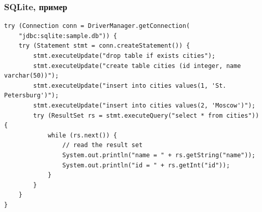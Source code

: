 \documentclass[xetex,mathserif,serif]{beamer}
\begin{document}
	\begin{frame}[fragile]
		\frametitle{SQLite, пример}
		\begin{footnotesize}
			\begin{verbatim}
try (Connection conn = DriverManager.getConnection(
    "jdbc:sqlite:sample.db")) {
    try (Statement stmt = conn.createStatement()) {
        stmt.executeUpdate("drop table if exists cities");
        stmt.executeUpdate("create table cities (id integer, name varchar(50))");
        stmt.executeUpdate("insert into cities values(1, 'St. Petersburg')");
        stmt.executeUpdate("insert into cities values(2, 'Moscow')");
        try (ResultSet rs = stmt.executeQuery("select * from cities")) {
            while (rs.next()) {
                // read the result set
                System.out.println("name = " + rs.getString("name"));
                System.out.println("id = " + rs.getInt("id"));
            }
        }
    }
}
			\end{verbatim}
		\end{footnotesize}
	\end{frame}
\end{document}
